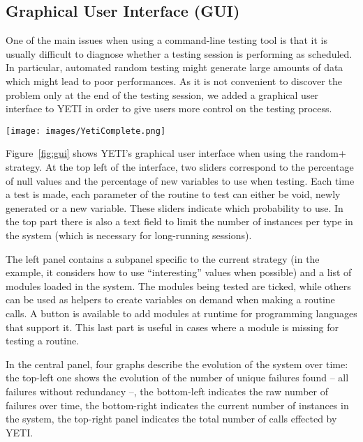 \subsection{Graphical User Interface (GUI)}
One of the main issues when using a command-line testing tool is that it is usually 
difficult to diagnose whether a testing session is performing as scheduled. 
In particular, automated random testing might generate large amounts of data which might lead to 
poor performances. 
As it is not convenient to discover the problem only at the end of the testing session, 
we added a graphical user interface to YETI in order to give users more control on the testing process.
 
%
\begin{sidewaysfigure}
\texttt{[image: images/YetiComplete.png]}
\caption{YETI graphical user interface.}\label{fig:gui}
\end{sidewaysfigure}

Figure~\ref{fig:gui} shows YETI's graphical user interface when using 
the random+ strategy. At the top left of the interface, two sliders correspond to 
the percentage of null values and the percentage of new variables to use when testing.
Each time a test is made, each parameter of the routine to test can either 
be void, newly generated or a new variable. These sliders indicate which probability 
to use. In the top part there is also a text field to limit the number of instances per 
type in the system (which is necessary for long-running sessions).

The left panel contains a subpanel specific to the current strategy (in the example, it 
considers how to use ``interesting'' values when possible) and a list of modules loaded in 
the system. The modules being tested are ticked, while others can be used as helpers to 
create variables on demand when making a routine calls. A button is available to add modules 
at runtime for programming languages that support it. This last part is useful in cases 
where a module is missing for testing a routine. 

In the central panel, four graphs describe the evolution of the system over time: the top-left one shows 
the evolution of the number of unique failures found -- all failures without redundancy --, the 
bottom-left indicates the raw number of failures over time, the bottom-right indicates the current 
number of instances in the system, the top-right panel indicates the total number of calls effected by YETI.


